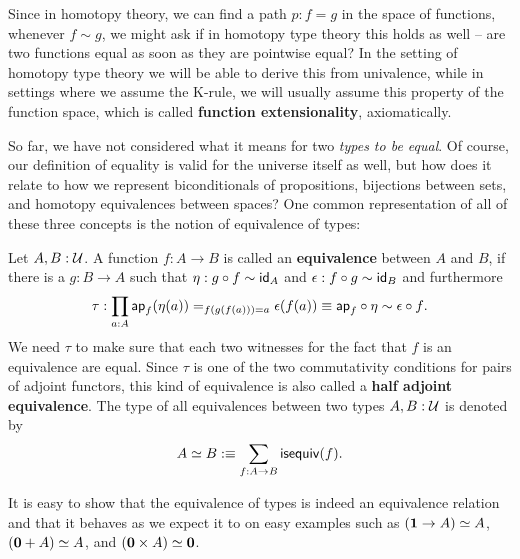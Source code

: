 \begin{remark}\label{rmk:tt-funext}
Since in homotopy theory, we can find a path $p : f = g$ in the space of
functions, whenever $f \sim g$,
we might ask if in homotopy type theory this holds as well --
are two functions equal as soon as they are pointwise equal?
In the setting of homotopy type theory we will be able to derive this from
univalence, while in settings where we assume the K-rule, we will usually
assume this property of the function space, which is called \textbf{function extensionality},
axiomatically.
\end{remark}

So far, we have not considered what it means for two \emph{types to be equal}.
Of course, our definition of equality is valid for the universe itself as well,
but how does it relate to how we represent
biconditionals of propositions,
bijections between sets,
and homotopy equivalences between spaces?
One common representation of all of these three concepts is the notion of
equivalence of types:
\begin{defn}[Equivalences]\label{def:tt-hae}
Let $A, B : \mathcal{U}$. A function $f : A \to B$ is called an \textbf{equivalence}
between $A$ and $B$, if there is a $g : B \to A$ such that
$\eta : g \circ f \sim \mathsf{id}_A$ and $\epsilon : f \circ g \sim \mathsf{id}_B$ and furthermore
\begin{equation*}
\tau : \prod_{a : A} \mathsf{ap}_f(\eta(a)) =_{f(g(f(a)))=a} \epsilon(f(a)) 
 \equiv \mathsf{ap}_f \circ \eta \sim \epsilon \circ f \text{.}
\end{equation*}
We need $\tau$ to make sure that each two witnesses for the fact that $f$ is an equivalence are
equal.
Since $\tau$ is one of the two commutativity conditions for pairs
of adjoint functors, this kind of equivalence is also called a \textbf{half
adjoint equivalence}.
The type of all equivalences between two types $A, B : \mathcal{U}$ is denoted by
\begin{equation*}
A \simeq B :\equiv \sum_{f : A \to B} \mathsf{isequiv}(f) \text{.}
\end{equation*}
\end{defn}
It is easy to show that the equivalence of types is indeed an equivalence relation
and that it behaves as we expect it to on easy examples such as
$(\mathbf{1} \to A) \simeq A$, $(\mathbf{0} + A) \simeq A$, and
$(\mathbf{0} \times A) \simeq \mathbf{0}$.

